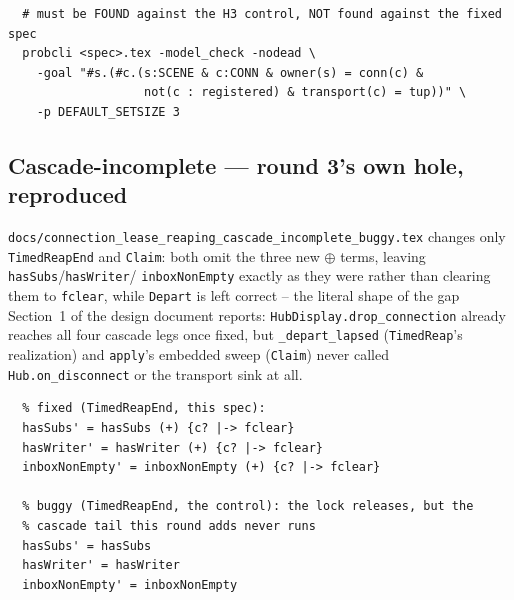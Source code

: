\documentclass[a4paper,10pt,fleqn]{article}
\begin{document}
\begin{verbatim}
  # must be FOUND against the H3 control, NOT found against the fixed spec
  probcli <spec>.tex -model_check -nodead \
    -goal "#s.(#c.(s:SCENE & c:CONN & owner(s) = conn(c) &
                   not(c : registered) & transport(c) = tup))" \
    -p DEFAULT_SETSIZE 3
\end{verbatim}

\subsection{Cascade-incomplete --- round 3's own hole, reproduced}
\label{sec:fidelity-cascade-incomplete}

\texttt{docs/connection\_lease\_reaping\_cascade\_incomplete\_buggy.tex}
changes only \texttt{TimedReapEnd} and \texttt{Claim}: both omit the three
new \(\oplus\) terms, leaving \texttt{hasSubs}/\texttt{hasWriter}/
\texttt{inboxNonEmpty} exactly as they were rather than clearing them to
\texttt{fclear}, while \texttt{Depart} is left correct -- the literal
shape of the gap Section~1 of the design document reports:
\texttt{HubDisplay.drop\_connection} already reaches all four cascade legs
once fixed, but \texttt{\_depart\_lapsed} (\texttt{TimedReap}'s
realization) and \texttt{apply}'s embedded sweep (\texttt{Claim}) never
called \texttt{Hub.on\_disconnect} or the transport sink at all.

\begin{verbatim}
  % fixed (TimedReapEnd, this spec):
  hasSubs' = hasSubs (+) {c? |-> fclear}
  hasWriter' = hasWriter (+) {c? |-> fclear}
  inboxNonEmpty' = inboxNonEmpty (+) {c? |-> fclear}

  % buggy (TimedReapEnd, the control): the lock releases, but the
  % cascade tail this round adds never runs
  hasSubs' = hasSubs
  hasWriter' = hasWriter
  inboxNonEmpty' = inboxNonEmpty
\end{verbatim}
\end{document}

